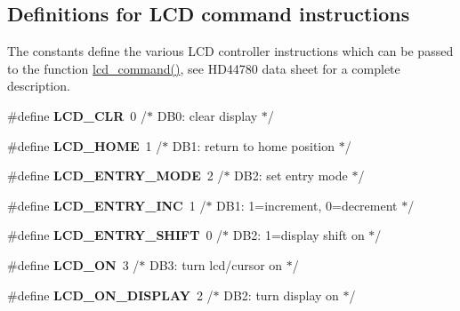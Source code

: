 \subsection*{Definitions for L\+CD command instructions}
\label{_amgrpe1b1604cb195ab970ebf8b6b8b3e322f}%
The constants define the various L\+CD controller instructions which can be passed to the function \hyperlink{group__pfleury__lcd_gaea9d14f02df06f948cb5a56776980826}{lcd\+\_\+command()}, see H\+D44780 data sheet for a complete description. \begin{DoxyCompactItemize}
\item 
\mbox{\label{group__pfleury__lcd_ga459688213267d13ccfbeb2c9004988cb}} 
\#define {\bfseries L\+C\+D\+\_\+\+C\+LR}~0 /$\ast$ D\+B0\+: clear display                  $\ast$/
\item 
\mbox{\label{group__pfleury__lcd_gae0e309ccad89222eb3457f2da9f2bb8d}} 
\#define {\bfseries L\+C\+D\+\_\+\+H\+O\+ME}~1 /$\ast$ D\+B1\+: return to home position        $\ast$/
\item 
\mbox{\label{group__pfleury__lcd_gae5d757ddb6d94de8c82191b60b40e442}} 
\#define {\bfseries L\+C\+D\+\_\+\+E\+N\+T\+R\+Y\+\_\+\+M\+O\+DE}~2 /$\ast$ D\+B2\+: set entry mode                 $\ast$/
\item 
\mbox{\label{group__pfleury__lcd_gada766266a0be0d0040fbf86e23b58aa6}} 
\#define {\bfseries L\+C\+D\+\_\+\+E\+N\+T\+R\+Y\+\_\+\+I\+NC}~1 /$\ast$   D\+B1\+: 1=increment, 0=decrement     $\ast$/
\item 
\mbox{\label{group__pfleury__lcd_ga14d0c7fda147e0dc8cdaa4a2629b3532}} 
\#define {\bfseries L\+C\+D\+\_\+\+E\+N\+T\+R\+Y\+\_\+\+S\+H\+I\+FT}~0 /$\ast$   D\+B2\+: 1=display shift on           $\ast$/
\item 
\mbox{\label{group__pfleury__lcd_ga47a809dfec086fdeca93dedc4fb83b44}} 
\#define {\bfseries L\+C\+D\+\_\+\+ON}~3 /$\ast$ D\+B3\+: turn lcd/cursor on             $\ast$/
\item 
\mbox{\label{group__pfleury__lcd_gae84f634b0a1661c4d5bbaafd9397732a}} 
\#define {\bfseries L\+C\+D\+\_\+\+O\+N\+\_\+\+D\+I\+S\+P\+L\+AY}~2 /$\ast$   D\+B2\+: turn display on              $\ast$/

\end{DoxyCompactItemize}
